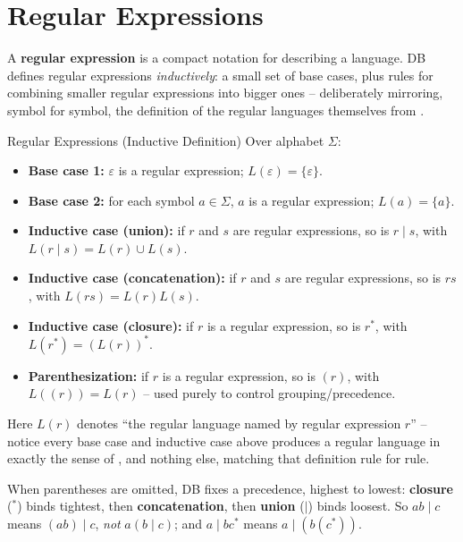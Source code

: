 \documentclass[full-course-notes.tex]{subfiles}
\begin{document}
\section{Regular Expressions}
\label{sec:l4-regular-expressions}

\dbtag A \textbf{regular expression} is a compact notation for describing a language. DB
defines regular expressions \emph{inductively}: a small set of base cases, plus rules for
combining smaller regular expressions into bigger ones -- deliberately mirroring, symbol for
symbol, the definition of the regular languages themselves from
.

\begin{defbox}{Regular Expressions (Inductive Definition)}
Over alphabet $\Sigma$:
\begin{itemize}
  \item \textbf{Base case 1:} $\varepsilon$ is a regular expression; $L(\varepsilon) = \{\varepsilon\}$.
  \item \textbf{Base case 2:} for each symbol $a \in \Sigma$, $a$ is a regular expression;
  $L(a) = \{a\}$.
  \item \textbf{Inductive case (union):} if $r$ and $s$ are regular expressions, so is
  $r \mid s$, with $L(r \mid s) = L(r) \cup L(s)$.
  \item \textbf{Inductive case (concatenation):} if $r$ and $s$ are regular expressions, so is
  $rs$, with $L(rs) = L(r)L(s)$.
  \item \textbf{Inductive case (closure):} if $r$ is a regular expression, so is $r^{*}$, with
  $L(r^{*}) = (L(r))^{*}$.
  \item \textbf{Parenthesization:} if $r$ is a regular expression, so is $(r)$, with
  $L((r)) = L(r)$ -- used purely to control grouping/precedence.
\end{itemize}
Here $L(r)$ denotes ``the regular language named by regular expression $r$'' -- notice every
base case and inductive case above produces a regular language in exactly the sense of
, and nothing else, matching that definition rule for
rule.
\end{defbox}

\begin{coreidea}
When parentheses are omitted, DB fixes a precedence, highest to lowest: \textbf{closure}
($^{*}$) binds tightest, then \textbf{concatenation}, then \textbf{union} ($\mid$) binds
loosest. So $ab \mid c$ means $(ab)\mid c$, \emph{not} $a(b\mid c)$; and $a\mid bc^{*}$ means
$a \mid (b(c^{*}))$.
\end{coreidea}
\end{document}
